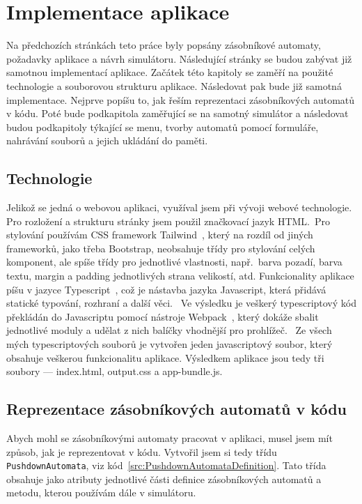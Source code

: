 \chapter{Implementace aplikace}\label{chap:AppImplemetation}

Na předchozích stránkách teto práce byly popsány zásobníkové automaty, požadavky aplikace a návrh simulátoru. Následující stránky se budou zabývat již samotnou implementací aplikace. Začátek této kapitoly se zaměří na použité technologie a souborovou strukturu aplikace. Následovat pak bude již samotná implementace. Nejprve popíšu to, jak řeším reprezentaci zásobníkových automatů v kódu. Poté bude podkapitola zaměřující se na samotný simulátor a následovat budou podkapitoly týkající se menu, tvorby automatů pomocí formuláře, nahrávání souborů a jejich ukládání do paměti.

\section{Technologie}

Jelikož se jedná o webovou aplikaci, využíval jsem při vývoji webové technologie. Pro rozložení a strukturu stránky jsem použil značkovací jazyk HTML.\ Pro stylování používám CSS framework Tailwind~\cite{Tailwind}, který na rozdíl od jiných frameworků, jako třeba Bootstrap, neobsahuje třídy pro stylování celých komponent, ale spíše třídy pro jednotlivé vlastnosti, např.~barva pozadí, barva textu, margin a padding jednotlivých strana velikostí, atd. Funkcionality aplikace píšu v jazyce Typescript~\cite{Typescript}, což je nástavba jazyka Javascript, která přidává statické typování, rozhraní a další věci.\ \cite{Kvapil2018} Ve výsledku je veškerý typescriptový kód překládán do Javascriptu pomocí nástroje Webpack~\cite{Webpack}, který dokáže sbalit jednotlivé moduly a udělat z nich balíčky vhodnější pro prohlížeč.\ \cite{Janca2017} Ze všech mých typescriptových souborů je vytvořen jeden javascriptový soubor, který obsahuje veškerou funkcionalitu aplikace. Výsledkem aplikace jsou tedy tři soubory --- index.html, output.css a app-bundle.js.

\section{Reprezentace zásobníkových automatů v kódu}

Abych mohl se zásobníkovými automaty pracovat v aplikaci, musel jsem mít způsob, jak je reprezentovat v kódu. Vytvořil jsem si tedy třídu \texttt{PushdownAutomata}, viz kód~\ref{src:PushdownAutomataDefinition}. Tato třída obsahuje jako atributy jednotlivé části definice zásobníkových automatů a metodu, kterou používám dále v simulátoru.

